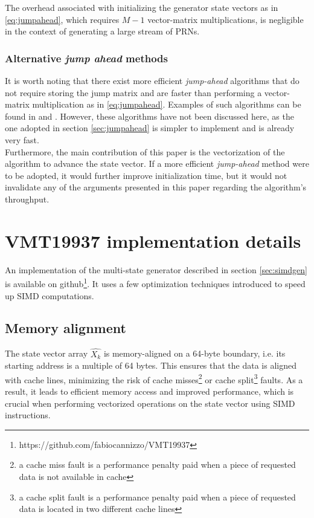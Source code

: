 \documentclass[preprint,1p,times]{elsarticle}
\begin{document}
	The overhead associated with initializing the generator state vectors as in \eqref{eq:jumpahead}, which requires $M-1$ vector-matrix multiplications, is negligible in the context of generating a large stream of PRNs.
	
	\subsubsection{Alternative \textit{jump ahead} methods}
	It is worth noting that there exist more efficient \textit{jump-ahead} algorithms that do not require storing the jump matrix and are faster than performing a vector-matrix multiplication as in \eqref{eq:jumpahead}. Examples of such algorithms can be found in \cite{jump1} and \cite{jump2}. However, these algorithms have not been discussed here, as the one adopted in section \ref{sec:jumpahead} is simpler to implement and is already very fast.\\
	
	Furthermore, the main contribution of this paper is the vectorization of the algorithm to advance the state vector. If a more efficient \textit{jump-ahead} method were to be adopted, it would further improve initialization time, but it would not invalidate any of the arguments presented in this paper regarding the algorithm's throughput.
	
	\section{VMT19937 implementation details}
	An implementation of the multi-state generator described in section \ref{sec:simdgen} is available on github\footnote{\label{fn:github} https://github.com/fabiocannizzo/VMT19937}. It uses a few optimization techniques introduced to speed up SIMD computations.
	
	\subsection{Memory alignment}
	The state vector array $\hat{X_k}$ is memory-aligned on a 64-byte boundary, i.e. its starting address is a multiple of 64 bytes. This ensures that the data is aligned with cache lines, minimizing the risk of cache misses\footnote{a cache miss fault is a performance penalty paid when a piece of requested data is not available in cache} or cache split\footnote{a cache split fault is a performance penalty paid when a piece of requested data is located in two different cache lines} faults. As a result, it leads to efficient memory access and improved performance, which is  crucial when performing vectorized operations on the state vector using SIMD instructions.
	
\end{document}
